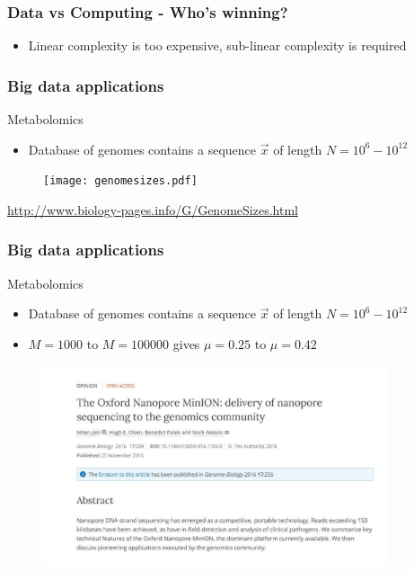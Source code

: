 \documentclass[10pt,xcolor=table]{beamer}
\begin{document}
\begin{frame}\frametitle{Data vs Computing - Who's winning?}

\pause
\begin{itemize}
\item Linear complexity is too expensive, sub-linear complexity is required
\end{itemize}

\end{frame}
\begin{frame}\frametitle{Big data applications}
\begin{block}{Metabolomics}
\begin{itemize}
  \item Database of genomes contains a sequence $\vec{x}$ of length $N=10^{6}-10^{12}$
\end{itemize}

\end{block}
  \begin{figure}[h]
  \texttt{[image: genomesizes.pdf]}
  \end{figure}

\url{http://www.biology-pages.info/G/GenomeSizes.html}
\end{frame}
\begin{frame}\frametitle{Big data applications}
\begin{block}{Metabolomics}
\begin{itemize}
  \item Database of genomes contains a sequence $\vec{x}$ of length $N=10^{6}-10^{12}$
  \item $M=1000$ to $M = 100000$ gives $\mu = 0.25$ to $\mu = 0.42$
\end{itemize}

  \begin{figure}[h]
  \includegraphics[width=4.0in]{genomebiology.pdf}
  \end{figure}


\end{block}

\end{frame}
\end{document}
